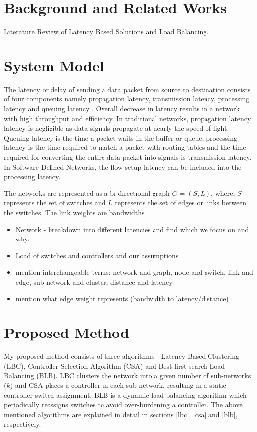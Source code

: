 \documentclass{IEEEtran}
\begin{document}
	\section{Background and Related Works}
	Literature Review of Latency Based Solutions and Load Balancing.
		
	\section{System Model}
	The latency or delay of sending a data packet from source to destination consists of four components namely propagation latency, transmission latency, processing latency and queuing latency \cite{forouzan2006data}. Overall decrease in latency results in a network with high throughput and efficiency. In traditional networks, propagation latency latency is negligible as data signals propagate at nearly the speed of light. Queuing latency is the time a packet waits in the buffer or queue, processing latency is the time required to match a packet with routing tables and the time required for converting the entire data packet into signals is transmission latency. In Software-Defined Networks, the flow-setup latency can be included into the processing latency.
	
	The networks \cite{knight2011internet} are represented as a bi-directional graph $G=(S,L)$, where, $S$ represents the set of switches and $L$ represents the set of edges or links between the switches. The link weights are bandwidths
	
	\begin{itemize}
		\item Network - breakdown into different latencies and find which we focus on and why.	
		\item Load of switches and controllers and our assumptions
		\item mention interchangeable terms: network and graph, node and switch, link and edge, sub-network and cluster, distance and latency
		\item mention what edge weight represents (bandwidth to latency/distance)
	\end{itemize}
	
	
	\section{Proposed Method}
	
	My proposed method consists of three algorithms - Latency Based Clustering (LBC), Controller Selection Algorithm (CSA) and Best-first-search Load Balancing (BLB). LBC clusters the network into a given number of sub-networks ($k$) and CSA places a controller in each sub-network, resulting in a static controller-switch assignment. BLB is a dynamic load balancing algorithm which periodically reassigns switches to avoid over-burdening a controller. The above mentioned algorithms are explained in detail in sections \ref{lbc}, \ref{csa} and \ref{blb}, respectively.
	
\end{document}
